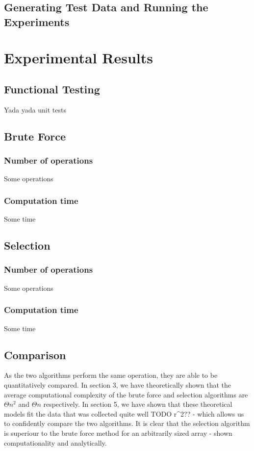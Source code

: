 \documentclass{article}
\begin{document}
    \subsection{Generating Test Data and Running the Experiments}

\section{Experimental Results}
    \subsection{Functional Testing}
        Yada yada unit tests
    \subsection{Brute Force}
        \subsubsection{Number of operations}
            Some operations
        \subsubsection{Computation time}
            Some time
    \subsection{Selection}
        \subsubsection{Number of operations}
            Some operations
        \subsubsection{Computation time}
            Some time


    \subsection{Comparison}
        As the two algorithms perform the same operation, they are able to be quantitatively compared. In section 3, we have theoretically shown that the average computational complexity of the brute force and selection algorithms are $\Theta{n^2}$ and $\Theta{n}$ respectively. In section 5, we have shown that these theoretical models fit the data that was collected quite well TODO r^2?? - which allows us to confidently compare the two algorithms. It is clear that the selection algorithm is superiour to the brute force method for an arbitrarily sized array - shown computationality and analytically.
\end{document}
